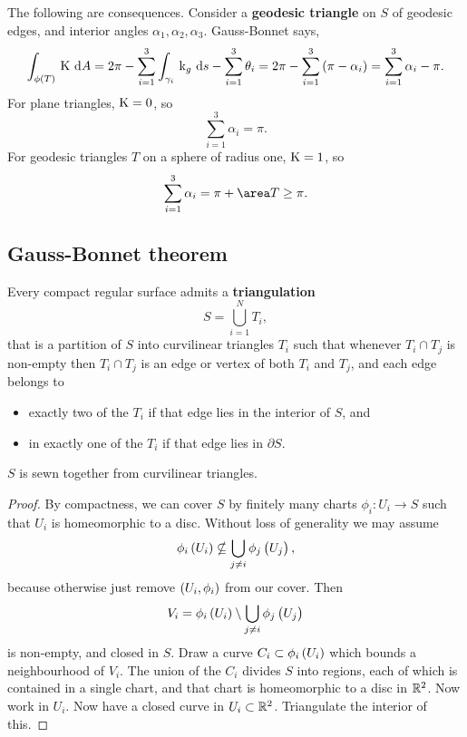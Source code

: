 The following are consequences. Consider a \textbf{geodesic triangle} on $ S $ of geodesic edges, and interior angles $ \alpha_1, \alpha_2, \alpha_3 $. Gauss-Bonnet says,
$$ \intd{\phi\br{T}}{}{\K}{A} = 2\pi - \sum_{i = 1}^3 \intd{\gamma_i}{}{\k_g}{s} - \sum_{i = 1}^3 \theta_i = 2\pi - \sum_{i = 1}^3 \br{\pi - \alpha_i} = \sum_{i = 1}^3 \alpha_i - \pi. $$
For plane triangles, $ \mathrm{K} = 0 $, so
$$ \sum_{i = 1}^3 \alpha_i = \pi. $$
For geodesic triangles $ T $ on a sphere of radius one, $ \mathrm{K} = 1 $, so
$$ \sum_{i = 1}^3 \alpha_i = \pi + \area T \ge \pi. $$

\pagebreak

\subsection{Gauss-Bonnet theorem}

\begin{proposition}
Every compact regular surface admits a \textbf{triangulation}
$$ S = \bigcup_{i = 1}^N T_i, $$
that is a partition of $ S $ into curvilinear triangles $ T_i $ such that whenever $ T_i \cap T_j $ is non-empty then $ T_i \cap T_j $ is an edge or vertex of both $ T_i $ and $ T_j $, and each edge belongs to
\begin{itemize}
\item exactly two of the $ T_i $ if that edge lies in the interior of $ S $, and
\item in exactly one of the $ T_i $ if that edge lies in $ \partial S $.
\end{itemize}
\end{proposition}

$ S $ is sewn together from curvilinear triangles.

\begin{proof}
By compactness, we can cover $ S $ by finitely many charts $ \phi_i : U_i \to S $ such that $ U_i $ is homeomorphic to a disc. Without loss of generality we may assume
$$ \phi_i\br{U_i} \nsubseteq \bigcup_{j \ne i} \phi_j\br{U_j}, $$
because otherwise just remove $ \br{U_i, \phi_i} $ from our cover. Then
$$ V_i = \phi_i\br{U_i} \setminus \bigcup_{j \ne i} \phi_j\br{U_j} $$
is non-empty, and closed in $ S $. Draw a curve $ C_i \subset \phi_i\br{U_i} $ which bounds a neighbourhood of $ V_i $. The union of the $ C_i $ divides $ S $ into regions, each of which is contained in a single chart, and that chart is homeomorphic to a disc in $ \mathbb{R}^2 $. Now work in $ U_i $. Now have a closed curve in $ U_i \subset \mathbb{R}^2 $. Triangulate the interior of this.
\end{proof}

